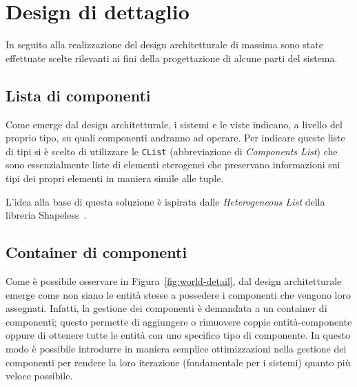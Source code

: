 \chapter{Design di dettaglio}\label{ch:design-di-dettaglio}
In seguito alla realizzazione del design architetturale di massima sono state effettuate scelte rilevanti
ai fini della progettazione di alcune parti del sistema.

\section{Lista di componenti}\label{sec:lista-di-componenti}
Come emerge dal design architetturale, i sistemi e le viste indicano, a livello del proprio tipo, su quali
componenti andranno ad operare.
Per indicare queste liste di tipi si è scelto di utilizzare le \texttt{CList} (abbreviazione di \textit{Components List})
che sono essenzialmente liste di elementi eterogenei che preservano informazioni sui tipi dei propri elementi in maniera
simile alle tuple.

L’idea alla base di questa soluzione è ispirata dalle \textit{Heterogeneous List} della libreria
Shapeless~\cite{shapeless}.

\section{Container di componenti}\label{sec:container-di-componenti}
Come è possibile osservare in Figura~\ref{fig:world-detail}, dal design architetturale emerge come
non siano le entità stesse a possedere i componenti che vengono loro assegnati.
Infatti, la gestione dei componenti è demandata a un container di componenti;
questo permette di aggiungere o rimuovere coppie entità-componente oppure di ottenere tutte le entità con uno specifico
tipo di componente.
In questo modo è possibile introdurre in maniera semplice ottimizzazioni nella gestione dei
componenti per rendere la loro iterazione (fondamentale per i sistemi) quanto più veloce possibile.

